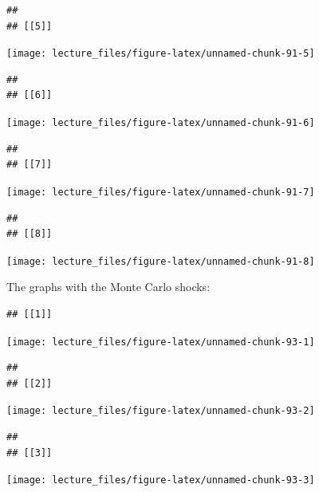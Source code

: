 \documentclass[]{book}
\begin{document}
\begin{verbatim}
## 
## [[5]]
\end{verbatim}

\begin{center}\texttt{[image: lecture\_files/figure-latex/unnamed-chunk-91-5]} \end{center}

\begin{verbatim}
## 
## [[6]]
\end{verbatim}

\begin{center}\texttt{[image: lecture\_files/figure-latex/unnamed-chunk-91-6]} \end{center}

\begin{verbatim}
## 
## [[7]]
\end{verbatim}

\begin{center}\texttt{[image: lecture\_files/figure-latex/unnamed-chunk-91-7]} \end{center}

\begin{verbatim}
## 
## [[8]]
\end{verbatim}

\begin{center}\texttt{[image: lecture\_files/figure-latex/unnamed-chunk-91-8]} \end{center}

The graphs with the Monte Carlo shocks:

\begin{verbatim}
## [[1]]
\end{verbatim}

\begin{center}\texttt{[image: lecture\_files/figure-latex/unnamed-chunk-93-1]} \end{center}

\begin{verbatim}
## 
## [[2]]
\end{verbatim}

\begin{center}\texttt{[image: lecture\_files/figure-latex/unnamed-chunk-93-2]} \end{center}

\begin{verbatim}
## 
## [[3]]
\end{verbatim}

\begin{center}\texttt{[image: lecture\_files/figure-latex/unnamed-chunk-93-3]} \end{center}
\end{document}
